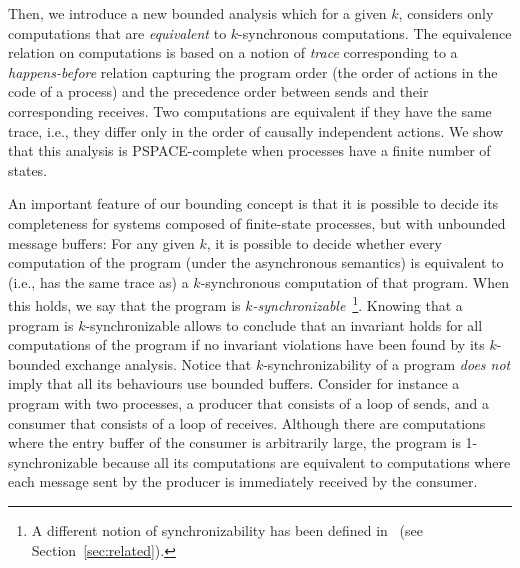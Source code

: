 Then, we introduce a new bounded analysis which %
for a given $k$, considers only computations that are {\em equivalent} to $k$-synchronous computations. The equivalence relation on computations is based on a notion of {\em trace} corresponding to a {\em happens-before} relation capturing the program order (the order of actions in the code of a process) and the precedence order between sends and their corresponding receives. Two computations are equivalent if they have the same trace, i.e., they differ only in the order of causally independent actions. 
We show that this analysis  is PSPACE-complete when processes have a finite number of states.
%

An important feature of our bounding concept is that it is possible to decide its completeness for systems composed of finite-state processes, but with unbounded message buffers: For any given $k$, it is possible to decide whether every computation of the program (under the asynchronous semantics) is equivalent to (i.e., has the same trace as) a $k$-synchronous computation of that program. 
When this holds, we say that the program is {\em $k$-synchronizable}~\footnote{A different notion of synchronizability has been defined in~\cite{DBLP:journals/tcs/BasuB16} (see Section~\ref{sec:related}).}. Knowing that a program is $k$-synchronizable allows to conclude that an invariant holds for all computations of the program if no invariant violations have been found by its $k$-bounded exchange analysis. Notice that $k$-synchronizability of a program {\em does not} imply that all its behaviours use bounded buffers.
Consider for instance a program with two processes, a producer that consists of a loop of sends, and a consumer that consists of a loop of receives. Although there are computations where the entry buffer of the consumer is arbitrarily large, the program is 1-synchronizable because all its computations are equivalent to computations where each message sent by the producer is immediately received by the consumer. 

